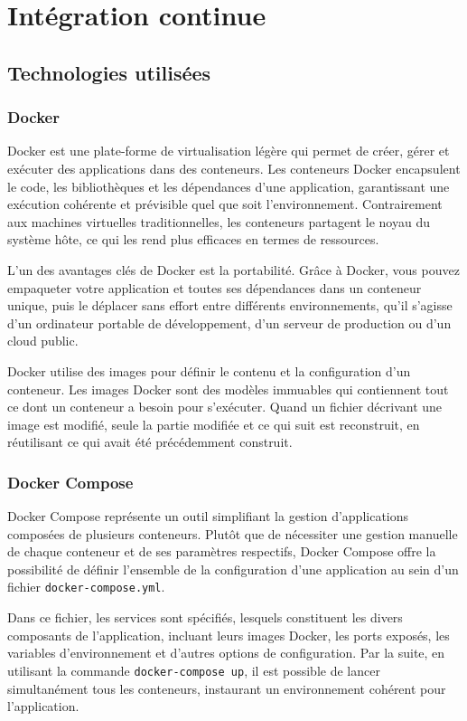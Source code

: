 \section{Intégration continue}
\subsection{Technologies utilisées}
\subsubsection{Docker}
Docker est une plate-forme de virtualisation légère qui permet de créer, gérer et exécuter des applications dans des conteneurs.
Les conteneurs Docker encapsulent le code, les bibliothèques et les dépendances d'une application, garantissant une exécution cohérente et prévisible quel que soit l'environnement.
Contrairement aux machines virtuelles traditionnelles, les conteneurs partagent le noyau du système hôte, ce qui les rend plus efficaces en termes de ressources.

L'un des avantages clés de Docker est la portabilité.
Grâce à Docker, vous pouvez empaqueter votre application et toutes ses dépendances dans un conteneur unique, puis le déplacer sans effort entre différents environnements, qu'il s'agisse d'un ordinateur portable de développement, d'un serveur de production ou d'un cloud public.

Docker utilise des images pour définir le contenu et la configuration d'un conteneur.
Les images Docker sont des modèles immuables qui contiennent tout ce dont un conteneur a besoin pour s'exécuter.
Quand un fichier décrivant une image est modifié, seule la partie modifiée et ce qui suit est reconstruit, en réutilisant ce qui avait été précédemment construit.

\subsubsection{Docker Compose}
Docker Compose représente un outil simplifiant la gestion d'applications composées de plusieurs conteneurs.
Plutôt que de nécessiter une gestion manuelle de chaque conteneur et de ses paramètres respectifs, Docker Compose offre la possibilité de définir l'ensemble de la configuration d'une application au sein d'un fichier \texttt{docker-compose.yml}.

Dans ce fichier, les services sont spécifiés, lesquels constituent les divers composants de l'application, incluant leurs images Docker, les ports exposés, les variables d'environnement et d'autres options de configuration.
Par la suite, en utilisant la commande \texttt{docker-compose up}, il est possible de lancer simultanément tous les conteneurs, instaurant un environnement cohérent pour l'application.

